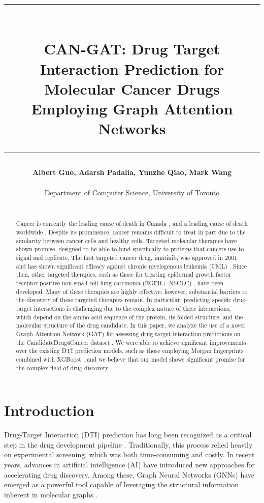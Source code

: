 \documentclass[fontsize=11pt]{article}
\title{%
    \vspace*{-0.1cm}%
    \rule{\linewidth}{1.5pt}\\[\baselineskip]%
    \textbf{CAN-GAT: Drug Target Interaction Prediction for Molecular Cancer Drugs Employing Graph Attention Networks}%
    \\[\baselineskip]\rule{\linewidth}{1.5pt}%
}
\author{
    \textbf{Albert Guo, Adarsh Padalia, Yunzhe Qiao, Mark Wang} \\~\\
    Department of Computer Science, University of Toronto \\~\\
    \text{aguo@cs.toronto.edu} \quad \text{\{adarsh.padalia, s.qiao, markhy.wang\}@mail.utoronto.ca}
}
\date{}
\begin{document}
\maketitle
\begin{abstract}
Cancer is currently the leading cause of death in Canada \cite{CCS2021}, and a leading cause of death worldwide \cite{Sung2021}. Despite its prominence, cancer remains difficult to treat in part due to the similarity between cancer cells and healthy cells. Targeted molecular therapies have shown promise, designed to be able to bind specifically to proteins that cancers use to signal and replicate. The first targeted cancer drug, imatinib, was approved in 2001 and has shown significant efficacy against chronic myelogenous leukemia (CML) \cite{Druker2001}. Since then, other targeted therapies, such as those for treating epidermal growth factor receptor positive non-small cell lung carcinoma (EGFR+ NSCLC) \cite{Rosell2012}, have been developed. Many of these therapies are highly effective; however, substantial barriers to the discovery of these targeted therapies remain. In particular, predicting specific drug-target interactions is challenging due to the complex nature of these interactions, which depend on the amino acid sequence of the protein, its folded structure, and the molecular structure of the drug candidate. In this paper, we analyze the use of a novel Graph Attention Network (GAT) \cite{Velickovic2018} for assessing drug-target interaction predictions on the CandidateDrug4Cancer dataset \cite{Ye2022}. We were able to achieve significant improvements over the existing DTI prediction models, such as those employing Morgan fingerprints \cite{Rogers2010} combined with XGBoost \cite{ChenGuestrin2016}, and we believe that our model shows significant promise for the complex field of drug discovery.
\end{abstract}

\section*{Introduction}

Drug-Target Interaction (DTI) prediction has long been recognized as a critical step in the drug development pipeline \cite{Chen2016}. Traditionally, this process relied heavily on experimental screening, which was both time-consuming and costly. In recent years, advances in artificial intelligence (AI) have introduced new approaches for accelerating drug discovery. Among these, Graph Neural Networks (GNNs) have emerged as a powerful tool capable of leveraging the structural information inherent in molecular graphs \cite{Velickovic2018}.
\end{document}
